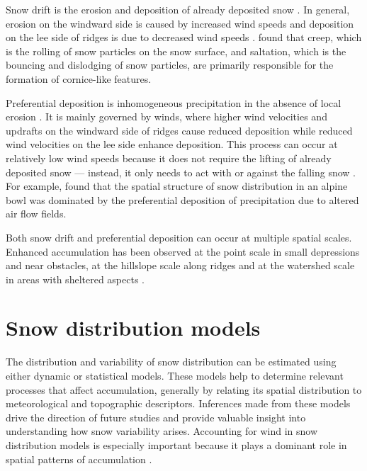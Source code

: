 \documentclass{sfuthesis}
\begin{document}
Snow drift is the erosion and deposition of already deposited snow \citep{Dadic2010}. In general, erosion on the windward side is caused by increased wind speeds and deposition on the lee side of ridges is due to decreased wind speeds \citep{Liston1998, Mott2008, Dadic2010}. \cite{Mott2010} found that creep, which is the rolling of snow particles on the snow surface, and saltation, which is the bouncing and dislodging of snow particles, are primarily responsible for the formation of cornice-like features. 

Preferential deposition is inhomogeneous precipitation in the absence of local erosion \citep{Lehning2008}. It is mainly governed by winds, where higher wind velocities and updrafts on the windward side of ridges cause reduced deposition while reduced wind velocities on the lee side enhance deposition. This process can occur at relatively low wind speeds because it does not require the lifting of already deposited snow  --- instead, it only needs to act with or against the falling snow \citep{Mott2008, Dadic2010}. For example, \cite{Mott2011} found that the spatial structure of snow distribution in an alpine bowl was dominated by the preferential deposition of precipitation due to altered air flow fields. 

Both snow drift and preferential deposition can occur at multiple spatial scales. Enhanced accumulation has been observed at the point scale in small depressions and near obstacles, at the hillslope scale along ridges and at the watershed scale in areas with sheltered aspects \citep{Harrison1986, Bloeschl1992, Mott2008, Winstral2002, Clark2011}. 

\section{Snow distribution models}
The distribution and variability of snow distribution can be estimated using either dynamic or statistical models. These models help to determine relevant processes that affect accumulation, generally by relating its spatial distribution to meteorological and topographic descriptors. Inferences made from these models drive the direction of future studies and provide valuable insight into understanding how snow variability arises. Accounting for wind in snow distribution models is especially important because it plays a dominant role in spatial patterns of accumulation \citep{Winstral2013}.
\end{document}
